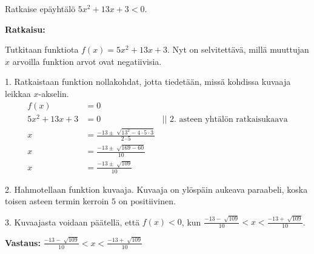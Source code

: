 \begin{esimerkki}

Ratkaise epäyhtälö $5x^2+13x+3<0$.

\textbf{Ratkaisu:}

Tutkitaan funktiota $f(x)=5x^2+13x+3$. Nyt on selvitettävä, millä muuttujan $x$ arvoilla funktion arvot ovat negatiivisia.

1. Ratkaistaan funktion nollakohdat, jotta tiedetään, missä kohdissa kuvaaja leikkaa $x$-akselin.
\begin{align*}
f(x)&=0 \\
5x^2+13x+3&=0 & || \text{ 2. asteen yhtälön ratkaisukaava}  \\
x&=\frac{-13 \pm \sqrt[]{13^2-4 \cdot 5 \cdot 3}}{2 \cdot 5} & \\
x&=\frac{-13 \pm \sqrt[]{169-60}}{10} & \\
x&=\frac{-13 \pm \sqrt[]{109}}{10} & 
\end{align*}

2. Hahmotellaan funktion kuvaaja.
Kuvaaja on ylöspäin aukeava paraabeli, koska toisen asteen termin kerroin $5$ on positiivinen. 

\begin{lukusuora}{-2.5}{2.5}{5}
\end{lukusuora}

3. Kuvaajasta voidaan päätellä, että $f(x)<0$, kun $\frac{-13 - \sqrt[]{109}}{10}<x< \frac{-13 + \sqrt[]{109}}{10}$.

\textbf{Vastaus:}
$\frac{-13 - \sqrt[]{109}}{10}<x< \frac{-13 + \sqrt[]{109}}{10}$

\end{esimerkki}

